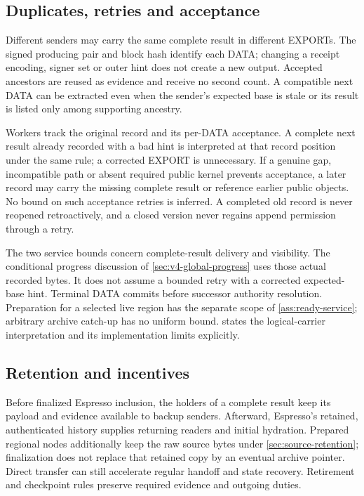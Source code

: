 \documentclass[11pt,a4paper]{article}
\begin{document}
\subsection{Duplicates, retries and acceptance}
Different senders may carry the same complete result in different EXPORTs.
The signed producing pair and block hash identify each DATA; changing a
receipt encoding, signer set or outer hint does not create a new output.
Accepted ancestors are reused as evidence and receive no second count.
A compatible next DATA can be extracted even when the sender's expected
base is stale or its result is listed only among supporting ancestry.

Workers track the original record and its per-DATA acceptance. A complete
next result already recorded with a bad hint is interpreted at that
record position under the same rule; a corrected EXPORT is unnecessary.
If a genuine gap, incompatible path or absent required public kernel prevents
acceptance, a later record may carry the missing complete result or
reference earlier public objects. No bound on such acceptance retries
is inferred. A completed old record is never reopened retroactively,
and a closed version never regains append permission through a retry.

The two service bounds concern complete-result delivery and visibility.
The conditional progress discussion of \cref{sec:v4-global-progress}
uses those actual recorded bytes. It does not assume a bounded retry
with a corrected expected-base hint. Terminal DATA commits before successor authority
resolution. Preparation for a selected live region has the separate
scope of \cref{ass:ready-service}; arbitrary archive catch-up has no
uniform bound.  states
the logical-carrier interpretation and its implementation limits explicitly.

\subsection{Retention and incentives}
Before finalized Espresso inclusion, the holders of a complete result
keep its payload and evidence available to backup senders. Afterward,
Espresso's retained, authenticated history supplies returning readers and
initial hydration. Prepared regional nodes additionally keep the raw
source bytes under \cref{sec:source-retention}; finalization does not
replace that retained copy by an eventual archive pointer. Direct transfer
can still accelerate regular handoff and state recovery. Retirement and
checkpoint rules preserve required evidence and outgoing duties.
\end{document}
